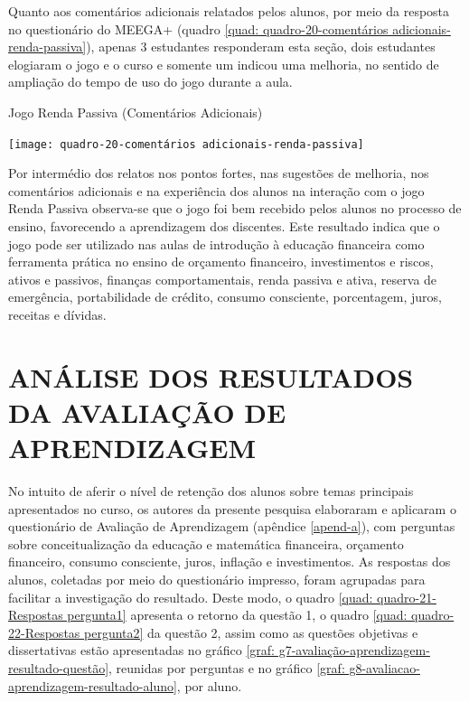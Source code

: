 Quanto aos comentários adicionais relatados pelos alunos, por meio da resposta no questionário do MEEGA+ (quadro \ref{quad: quadro-20-comentários adicionais-renda-passiva}), apenas 3 estudantes responderam esta seção, dois estudantes elogiaram o jogo e o curso e somente um indicou uma melhoria, no sentido de ampliação do tempo de uso do jogo durante a aula.

\graphicspath{{quadros/}} 
\begin{quadro}[!ht]
\centering
\begin{minipage}{0.8\textwidth}
\caption{Jogo Renda Passiva (Comentários Adicionais)}
\centering
\texttt{[image: quadro-20-comentários adicionais-renda-passiva]}
\label{quad: quadro-20-comentários adicionais-renda-passiva}
\end{minipage}
\end{quadro}

Por intermédio dos relatos nos pontos fortes, nas sugestões de melhoria, nos comentários adicionais e na experiência dos alunos na interação com o jogo Renda Passiva observa-se que o jogo foi bem recebido pelos alunos no processo de ensino, favorecendo a aprendizagem dos discentes. Este resultado indica que o jogo pode ser utilizado nas aulas de introdução à educação financeira como ferramenta prática no ensino de orçamento financeiro, investimentos e riscos, ativos e passivos, finanças comportamentais, renda passiva e ativa, reserva de emergência, portabilidade de crédito, consumo consciente, porcentagem, juros, receitas e dívidas.

\section{ANÁLISE DOS RESULTADOS DA AVALIAÇÃO DE APRENDIZAGEM}
No intuito de aferir o nível de retenção dos alunos sobre temas principais apresentados no curso, os autores da presente pesquisa elaboraram e aplicaram o questionário de Avaliação de Aprendizagem (apêndice \ref{apend-a}), com perguntas sobre conceitualização da educação e matemática financeira, orçamento financeiro, consumo consciente, juros, inflação e investimentos. As respostas dos alunos, coletadas por meio do questionário impresso, foram agrupadas para facilitar a investigação do resultado. Deste modo, o quadro \ref{quad: quadro-21-Respostas  pergunta1} apresenta o retorno da questão 1, o quadro \ref{quad: quadro-22-Respostas  pergunta2} da questão 2, assim como as questões objetivas e dissertativas estão apresentadas no gráfico \ref{graf: g7-avaliação-aprendizagem-resultado-questão}, reunidas por perguntas e no gráfico \ref{graf: g8-avaliacao-aprendizagem-resultado-aluno}, por aluno.

